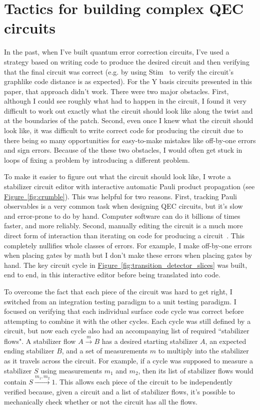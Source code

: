\documentclass[onecolumn,unpublished,a4paper]{quantumarticle}
\theoremstyle{definition}
\theoremstyle{definition}
\theoremstyle{definition}
\newcommand{\fig}[1]{\hyperref[fig:#1]{Figure~\ref*{fig:#1}}}
\begin{document}
\section{Tactics for building complex QEC circuits}
\label{app:the_struggle}

In the past, when I've built quantum error correction circuits, I've used a strategy based on writing code to produce the desired circuit and then verifying that the final circuit was correct (e.g. by using Stim~\cite{gidney2021stim} to verify the circuit's graphlike code distance is as expected).
For the Y basis circuits presented in this paper, that approach didn't work.
There were two major obstacles.
First, although I could see roughly what had to happen in the circuit, I found it very difficult to work out exactly what the circuit should look like along the twist and at the boundaries of the patch.
Second, even once I knew what the circuit should look like, it was difficult to write correct code for producing the circuit due to there being so many opportunities for easy-to-make mistakes like off-by-one errors and sign errors.
Because of the these two obstacles, I would often get stuck in loops of fixing a problem by introducing a different problem.

To make it easier to figure out what the circuit should look like, I wrote a stabilizer circuit editor with interactive automatic Pauli product propagation (see \fig{crumble}).
This was helpful for two reasons.
First, tracking Pauli observables is a very common task when designing QEC circuits, but it's slow and error-prone to do by hand.
Computer software can do it billions of times faster, and more reliably.
Second, manually editing the circuit is a much more direct form of interaction than iterating on code for producing a circuit~\cite{brettvictormediaforthinking2013}.
This completely nullifies whole classes of errors.
For example, I make off-by-one errors when placing gates by math but I don't make these errors when placing gates by hand.
The key circuit cycle in \fig{transition_detector_slices} was built, end to end, in this interactive editor before being translated into code.

To overcome the fact that each piece of the circuit was hard to get right, I switched from an integration testing paradigm to a unit testing paradigm.
I focused on verifying that each individual surface code cycle was correct before attempting to combine it with the other cycles.
Each cycle was still defined by a circuit, but now each cycle also had an accompanying list of required ``stabilizer flows".
A stabilizer flow $A \xrightarrow{m} B$ has a desired starting stabilizer $A$, an expected ending stabilizer $B$, and a set of measurements $m$ to multiply into the stabilizer as it travels across the circuit.
For example, if a cycle was supposed to measure a stabilizer $S$ using measurements $m_1$ and $m_2$, then its list of stabilizer flows would contain $S \xrightarrow{m_1, m_2} 1$.
This allows each piece of the circuit to be independently verified because, given a circuit and a list of stabilizer flows, it's possible to mechanically check whether or not the circuit has all the flows.
\end{document}
